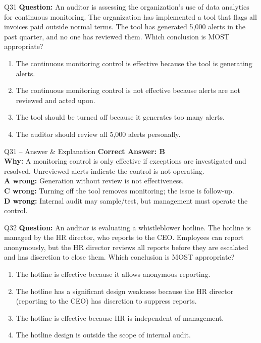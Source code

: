 \documentclass[aspectratio=169,10pt]{beamer}
\begin{document}
	\begin{frame}[t]{Q31}
		\small
		\textbf{Question:} An auditor is assessing the organization's use of data analytics for continuous monitoring. The organization has implemented a tool that flags all invoices paid outside normal terms. The tool has generated 5,000 alerts in the past quarter, and no one has reviewed them. Which conclusion is MOST appropriate?
		\begin{enumerate}[label=\Alph*.,itemsep=1pt,topsep=2pt]
			\item The continuous monitoring control is effective because the tool is generating alerts.
			\item The continuous monitoring control is not effective because alerts are not reviewed and acted upon.
			\item The tool should be turned off because it generates too many alerts.
			\item The auditor should review all 5,000 alerts personally.
		\end{enumerate}
	\end{frame}
	
	\begin{frame}[t]{Q31 -- Answer \& Explanation}
		\small
		\textbf{Correct Answer: B} \\[4pt]
		\textbf{Why:} A monitoring control is only effective if exceptions are investigated and resolved. Unreviewed alerts indicate the control is not operating. \\[4pt]
		\textbf{A wrong:} Generation without review is not effectiveness. \\[2pt]
		\textbf{C wrong:} Turning off the tool removes monitoring; the issue is follow-up. \\[2pt]
		\textbf{D wrong:} Internal audit may sample/test, but management must operate the control.
	\end{frame}
	
	\begin{frame}[t]{Q32}
		\small
		\textbf{Question:} An auditor is evaluating a whistleblower hotline. The hotline is managed by the HR director, who reports to the CEO. Employees can report anonymously, but the HR director reviews all reports before they are escalated and has discretion to close them. Which conclusion is MOST appropriate?
		\begin{enumerate}[label=\Alph*.,itemsep=1pt,topsep=2pt]
			\item The hotline is effective because it allows anonymous reporting.
			\item The hotline has a significant design weakness because the HR director (reporting to the CEO) has discretion to suppress reports.
			\item The hotline is effective because HR is independent of management.
			\item The hotline design is outside the scope of internal audit.
		\end{enumerate}
	\end{frame}
	
\end{document}
